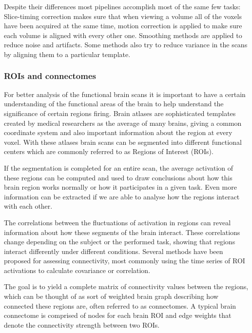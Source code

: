 		Despite their differences most pipelines accomplish most of the same few tasks: Slice-timing correction makes sure that when viewing a volume all of the voxels have been acquired at the same time, motion correction is applied to make sure each volume is aligned with every other one. Smoothing methods are applied to reduce noise and artifacts. Some methods also try to reduce variance in the scans by aligning them to a particular template.
		
		\subsubsection{ROIs and connectomes}
		
		For better analysis of the functional brain scans it is important to have a certain understanding of the functional areas of the brain to help understand the significance of certain regions firing. Brain atlases are sophisticated templates created by medical researchers as the average of many brains, giving a common coordinate system and also important information about the region at every voxel. With these atlases brain scans can be segmented into different functional centers which are commonly referred to as Regions of Interest (ROIs). 
		
		If the segmentation is completed for an entire scan, the average activation of these regions can be computed and used to draw conclusions about how this brain region works normally or how it participates in a given task. Even more information can be extracted if we are able to analyse how the regions interact with each other\cite{rogers2007assessing}. 
		
		The correlations between the fluctuations of activation in regions can reveal information about how these segments of the brain interact. These correlations change depending on the subject or the performed task, showing that regions interact differently under different conditions. Several methods have been proposed for assessing connectivity, most commonly using the time series of ROI activations to calculate covariance or correlation. 
		
		The goal is to yield a complete matrix of connectivity values between the regions, which can be thought of as sort of weighted brain graph describing how connected these regions are, often referred to as connectomes. A typical brain connectome is comprised of nodes for each brain ROI and edge weights that denote the connectivity strength between two ROIs\cite{bassett2017network}.
		
		